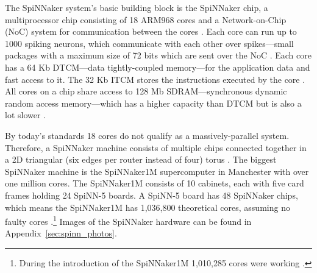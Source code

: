 \documentclass[]{article}
\begin{document}
The SpiNNaker system's basic building block is the SpiNNaker chip,
a multiprocessor chip consisting of 18 ARM968 cores
\citep{furber_et_al_2020} and a
Network-on-Chip (NoC) system for communication between the cores
\citep{furber_et_al_2007}.
Each core can run up to 1000 spiking neurons, which communicate with
each other over spikes---small packages with a maximum size of 72 bits
which are sent over the NoC \citep{furber_et_al_2007, spinnaker_2020}.
Each core has a 64 Kb DTCM---data tightly-coupled memory---for the
application data and fast access to it.
The 32 Kb ITCM stores the instructions executed by the core
\citep{furber_et_al_2020}.
All cores on a chip share access to 128 Mb SDRAM---synchronous
dynamic random access memory---which has a higher capacity than
DTCM but is also a lot slower
\citep{furber_et_al_2020, spinnaker_2020a}.

By today's standards 18 cores do not qualify as a massively-parallel
system.
Therefore, a SpiNNaker machine consists of multiple chips connected
together in a 2D triangular (six edges per router instead of four)
torus \citep{furber_et_al_2020}.
The biggest SpiNNaker machine is the SpiNNaker1M supercomputer in
Manchester with over one million cores.
The SpiNNaker1M consists of 10 cabinets, each with five card frames
holding 24 SpiNN-5 boards.
A SpiNN-5 board has 48 SpiNNaker chips, which means the SpiNNaker1M
has 1,036,800 theoretical cores, assuming no faulty cores
\citep{furber_et_al_2020}.\footnote{During the introduction of the
  SpiNNaker1M 1,010,285 cores were working \citep{uoecompsci_2019}.}
Images of the SpiNNaker hardware can be found in
Appendix~\ref{sec:spinn_photos}.
\end{document}
